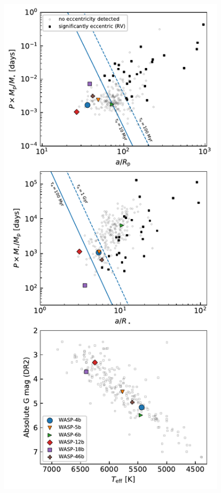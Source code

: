 \documentclass[12pt,twocolumn,tighten]{aastex62}
\begin{document}
\begin{figure}[t]
  \begin{center}
    \includegraphics[height=0.9\textheight]{f5.pdf}
  \end{center}

\end{figure}
\end{document}
